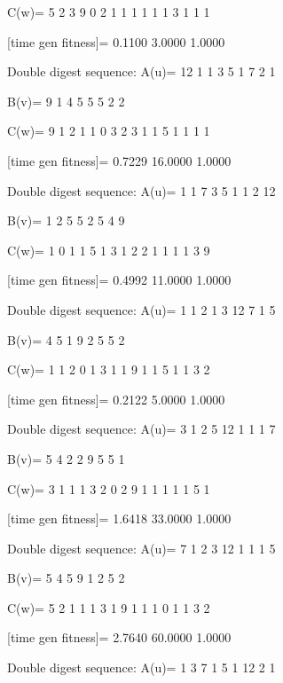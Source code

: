 C(w)=
     5     2     3     9     0     2     1     1     1     1     1     1     3     1     1     1

[time gen fitness]=
    0.1100    3.0000    1.0000

Double digest sequence:
A(u)=
    12     1     1     3     5     1     7     2     1

B(v)=
     9     1     4     5     5     5     2     2

C(w)=
     9     1     2     1     1     0     3     2     3     1     1     5     1     1     1     1

[time gen fitness]=
    0.7229   16.0000    1.0000

Double digest sequence:
A(u)=
     1     1     7     3     5     1     1     2    12

B(v)=
     1     2     5     5     2     5     4     9

C(w)=
     1     0     1     1     5     1     3     1     2     2     1     1     1     1     3     9

[time gen fitness]=
    0.4992   11.0000    1.0000

Double digest sequence:
A(u)=
     1     1     2     1     3    12     7     1     5

B(v)=
     4     5     1     9     2     5     5     2

C(w)=
     1     1     2     0     1     3     1     1     9     1     1     5     1     1     3     2

[time gen fitness]=
    0.2122    5.0000    1.0000

Double digest sequence:
A(u)=
     3     1     2     5    12     1     1     1     7

B(v)=
     5     4     2     2     9     5     5     1

C(w)=
     3     1     1     1     3     2     0     2     9     1     1     1     1     1     5     1

[time gen fitness]=
    1.6418   33.0000    1.0000

Double digest sequence:
A(u)=
     7     1     2     3    12     1     1     1     5

B(v)=
     5     4     5     9     1     2     5     2

C(w)=
     5     2     1     1     1     3     1     9     1     1     1     0     1     1     3     2

[time gen fitness]=
    2.7640   60.0000    1.0000

Double digest sequence:
A(u)=
     1     3     7     1     5     1    12     2     1

